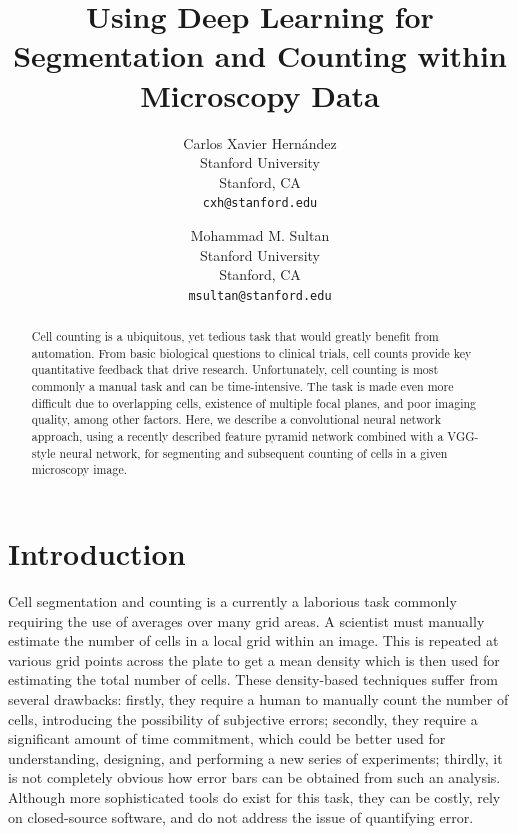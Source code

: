 \documentclass[10pt,twocolumn,letterpaper]{article}
\begin{document}
\title{Using Deep Learning for Segmentation and Counting within Microscopy Data
	}

\author{Carlos Xavier Hern\'{a}ndez\\
Stanford University\\
Stanford, CA\\
{\tt\small cxh@stanford.edu}
\and
Mohammad M. Sultan\\
Stanford University\\
Stanford, CA\\
{\tt\small msultan@stanford.edu}
}

\maketitle

\begin{abstract}
Cell counting is a ubiquitous, yet tedious task that would greatly benefit from automation.
From basic biological questions to clinical trials, cell counts provide key quantitative
feedback that drive research. Unfortunately, cell counting is most commonly a manual task
and can be time-intensive. The task is made even more difficult due to overlapping cells,
existence of multiple focal planes, and poor imaging quality, among other factors.
Here, we describe a convolutional neural network approach, using a recently described
feature pyramid network combined with a VGG-style neural network, for segmenting and
subsequent counting of cells in a given microscopy image.
   
\end{abstract}

\section{Introduction}
Cell segmentation and counting is a currently a laborious task commonly requiring the use of averages over
many grid areas\cite{Abcam}. A scientist must manually estimate the number of cells in a local grid within an image.
This is repeated at various grid points across the plate to get a mean density which is then used for estimating the
total number of cells. These density-based techniques suffer from several drawbacks: firstly, they require a human
to manually count the number of cells, introducing the possibility of subjective errors;
secondly, they require a significant amount of time commitment, which could be better used for understanding, designing,
and performing a new series of experiments; thirdly, it is not completely obvious how error bars can be obtained from such
an analysis. Although more sophisticated tools do exist for this task, they can be costly, rely on closed-source software,
and do not address the issue of quantifying error.
\end{document}
